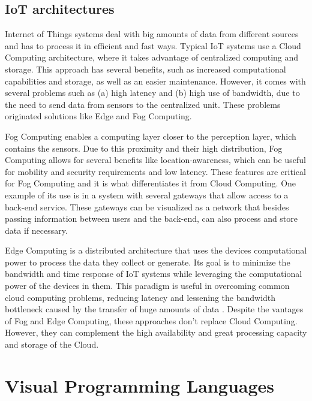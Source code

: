 \subsection{IoT architectures}\label{sec:architectures}

Internet of Things systems deal with big amounts of data from different sources and has to process it in efficient and fast ways. Typical IoT systems use a Cloud Computing architecture, where it takes advantage of centralized computing and storage. This approach has several benefits, such as increased computational capabilities and storage, as well as an easier maintenance. However, it comes with several problems such as (a) high latency and (b) high use of bandwidth, due to the need to send data from sensors to the centralized unit. \cite{connecting_fog_and_cloud} These problems originated solutions like Edge and Fog Computing.
\par Fog Computing enables a computing layer closer to the perception layer, which contains the sensors. Due to this proximity and their high distribution, Fog Computing allows for several benefits like location-awareness, which can be useful for mobility and security requirements and low latency. These features are critical for Fog Computing and it is what differentiates it from Cloud Computing. One example of its use is in a system with several gateways that allow access to a back-end service. These gateways can be visualized as a network that besides passing information between users and the back-end, can also process and store data if necessary. \cite{fog_computing_book}
\par Edge Computing is a distributed architecture that uses the devices computational power to process the data they collect or generate. Its goal is to minimize the bandwidth and time response of IoT systems while leveraging the computational power of the devices in them. This paradigm is useful in overcoming common cloud computing problems, reducing latency and lessening the bandwidth bottleneck caused by the transfer of huge amounts of data \cite{edge_computing}. 
Despite the vantages of Fog and Edge Computing, these approaches don't replace Cloud Computing. However, they can complement the high availability and great processing capacity and storage of the Cloud.

\section{Visual Programming Languages}\label{sec:background_vpl}

